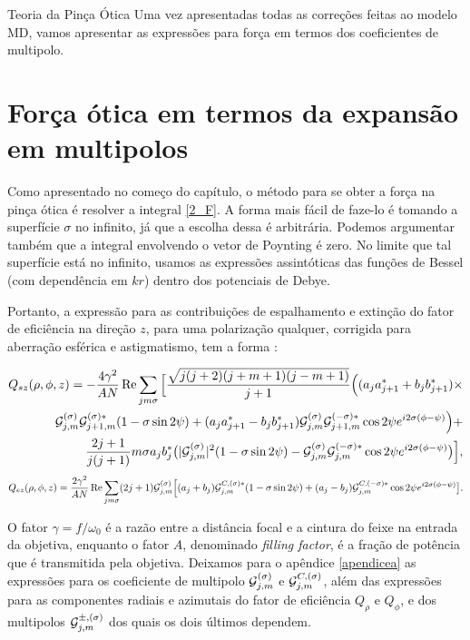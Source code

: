 \begin{chapter}{Teoria da Pinça Ótica}
Uma vez apresentadas todas as correções feitas ao modelo MD, vamos apresentar as expressões para força em termos dos coeficientes de multipolo.

%
%
%
%
\section{Força ótica em termos da expansão em multipolos}
\label{forcaotica}

\hspace{5 mm}Como apresentado no começo do capítulo, o método para se obter a força na pinça ótica é resolver a integral \ref{2_F}. A forma mais fácil de faze-lo é tomando a superfície $\sigma$ no infinito, já que a escolha dessa é arbitrária. Podemos argumentar também que a integral envolvendo o vetor de Poynting é zero. No limite que tal superfície está no infinito, usamos as expressões assintóticas das funções de Bessel (com dependência em $kr$) dentro dos potenciais de Debye. 

Portanto, a expressão para as contribuições de espalhamento e extinção do fator de eficiência na direção $z$, para uma polarização qualquer, corrigida para aberração esférica e astigmatismo, tem a forma \cite{Diniz2019}:

\begin{equation}
\begin{split}
Q_{sz}(\rho,\phi,z) = -\frac{4\gamma^2}{AN}\operatorname{Re}\sum\limits_{jm\sigma} \Big{[} \frac{\sqrt{j(j+2)(j+m+1)(j-m+1)}}{j+1} \Big{(} (a_ja^*_{j+1}+b_jb^*_{j+1})\times \\ \mathcal G^{(\sigma)}_{j,m}\mathcal G^{(\sigma)*}_{j+1,m}(1-\sigma\sin2\psi) + (a_ja^*_{j+1}-b_jb^*_{j+1})\mathcal G^{(\sigma)}_{j,m}\mathcal G^{(-\sigma)*}_{j+1,m}\cos2\psi e^{i2\sigma(\phi-\psi)} \Big{)} + \\ \frac{2j+1}{j(j+1)} m\sigma a_jb^*_j\big{(} |\mathcal G^{(\sigma)}_{j,m}|^2(1-\sigma\sin2\psi)-\mathcal G^{(\sigma)}_{j,m}\mathcal G^{(-\sigma)*}_{j,m}\cos2\psi e^{i2\sigma(\phi-\psi)} \big{)} \Big{]},
\end{split}
\end{equation}
%
\begin{equation}
Q_{ez}(\rho,\phi,z) = \frac{2\gamma^2}{AN}\operatorname{Re}\sum\limits_{jm\sigma} (2j+1)\mathcal G^{(\sigma)}_{j,m} \Big{[} (a_j+b_j) \mathcal G^{C,(\sigma)*}_{j,m}(1-\sigma\sin 2\psi) + (a_j-b_j) \mathcal G^{C,(-\sigma)*}_{j,m}\cos2\psi e^{i2\sigma(\phi-\psi)} \big{]}.
\end{equation}
%

O fator $\gamma=f/\omega_0$ é a razão entre a distância focal e a cintura do feixe na entrada da objetiva, enquanto o fator $A$, denominado {\it filling factor}, é a fração de potência que é transmitida pela objetiva. Deixamos para o apêndice \ref{apendicea} as expressões para os coeficiente de multipolo $\mathcal G^{(\sigma)}_{j,m}$ e $\mathcal G^{C,(\sigma)}_{j,m}$, além das expressões para as componentes radiais e azimutais do fator de eficiência $Q_\rho$ e $Q_\phi$, e dos multipolos $\mathcal G^{\pm,(\sigma)}_{j,m}$ dos quais os dois últimos dependem.


\end{chapter}
